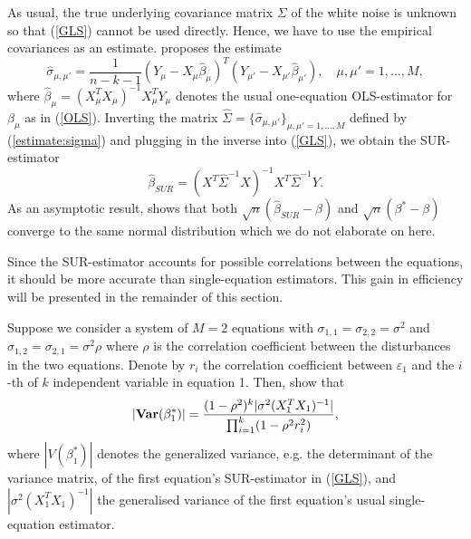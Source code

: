 \documentclass[a4paper, 11pt]{scrreprt}
\newcommand{\var}{\mbox{\textbf{Var}}}
\begin{document}
As usual, the true underlying covariance matrix $\Sigma$ of the white noise is unknown so that (\ref{GLS}) cannot be used directly. Hence, we have to use the empirical covariances as an estimate. \textcite[eq. (2.9)]{zellner1962efficient} proposes the estimate
\begin{equation}\label{estimate:sigma}
\hat{\sigma}_{\mu,\mu'} = \frac{1}{n - k -1} (Y_\mu - X_\mu \hat{\beta}_\mu)^T (Y_{\mu'} - X_{\mu'} \hat{\beta}_{\mu'}), \quad \mu,\mu' =1,\ldots,M,
\end{equation}
where $\hat{\beta}_\mu = (X_\mu^T X_\mu)^{-1} X_\mu^T Y_\mu$ denotes the usual one-equation OLS-estimator for $\beta_\mu$ as in (\ref{OLS}).
Inverting the matrix $\hat{\Sigma} = \{ \hat{\sigma}_{\mu,\mu'} \}_{\mu,\mu' = 1,\ldots, M}$  defined by (\ref{estimate:sigma}) and plugging in the inverse into (\ref{GLS}), we obtain the SUR-estimator 
\begin{equation}\label{SUR}
\hat{\beta}_{SUR} = (X^T \hat\Sigma^{-1} X)^{-1} X^T \hat\Sigma^{-1} Y.
\end{equation}
As an asymptotic result, \textcite[chapter 3.1]{zellner1962efficient} shows that both $\sqrt{n}(\hat{\beta}_{SUR} - \beta)$ and $\sqrt{n}(\beta^* - \beta)$ converge to the same normal distribution which we do not elaborate on here.

Since the SUR-estimator accounts for possible correlations between the equations, it should be more accurate than single-equation estimators. This gain in efficiency will be presented in the remainder of this section.

Suppose we consider a system of $M=2$ equations with $\sigma_{1,1} = \sigma_{2,2}= \sigma^2$ and \linebreak $\sigma_{1,2} = \sigma_{2,1} = \sigma^2 \rho$ where $\rho$ is the correlation coefficient between the disturbances in the two equations. Denote by $r_i$ the correlation coefficient between $\varepsilon_1$ and the $i$-th of $k$ independent variable in equation 1. Then, \textcite[eq. (3.28)]{zellner1962further} show that
\begin{equation}\label{SUR:efficiency}
| \var(\beta_1^*) | = \frac{(1-\rho^2)^k |\sigma^2 (X_1^T X_1)^{-1}|}{\prod_{i=1}^{k}(1-\rho^2 r_i^2)},
\end{equation}
where $| V(\beta_1^*) |$ denotes the generalized variance, e.g. the determinant of the variance matrix, of the first equation's SUR-estimator in (\ref{GLS}),
and $|\sigma^2 (X_1^T X_1)^{-1}|$ the generalised variance of the first equation's usual single-equation estimator.
\end{document}
